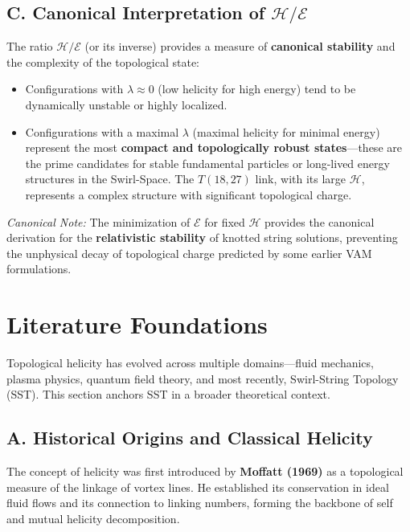 \documentclass[aps,prb,amsmath,amssymb]{revtex4-2} %
\newcommand{\Hcal}{\mathcal{H}}         %
\begin{document}
        \subsection*{C. Canonical Interpretation of $\Hcal/\mathcal{E}$}
            The ratio $\Hcal/\mathcal{E}$ (or its inverse) provides a measure of \textbf{canonical stability} and the complexity of the topological state:
            \begin{itemize}
                \item Configurations with $\lambda \approx 0$ (low helicity for high energy) tend to be dynamically unstable or highly localized.
                \item Configurations with a maximal $\lambda$ (maximal helicity for minimal energy) represent the most \textbf{compact and topologically robust states}—these are the prime candidates for stable fundamental particles or long-lived energy structures in the Swirl-Space. The $T(18,27)$ link, with its large $\Hcal$, represents a complex structure with significant topological charge.
            \end{itemize}

            \vspace{1em}
            \noindent\textit{Canonical Note:} The minimization of $\mathcal{E}$ for fixed $\Hcal$ provides the canonical derivation for the \textbf{relativistic stability} of knotted string solutions, preventing the unphysical decay of topological charge predicted by some earlier VAM formulations.

    \section*{Literature Foundations}
        \label{sec:literature}

        Topological helicity has evolved across multiple domains—fluid mechanics, plasma physics, quantum field theory, and most recently, Swirl-String Topology (SST). This section anchors SST in a broader theoretical context.

        \subsection*{A. Historical Origins and Classical Helicity}
            The concept of helicity was first introduced by \textbf{Moffatt (1969)} as a topological measure of the linkage of vortex lines. He established its conservation in ideal fluid flows and its connection to linking numbers, forming the backbone of self and mutual helicity decomposition.
\end{document}
